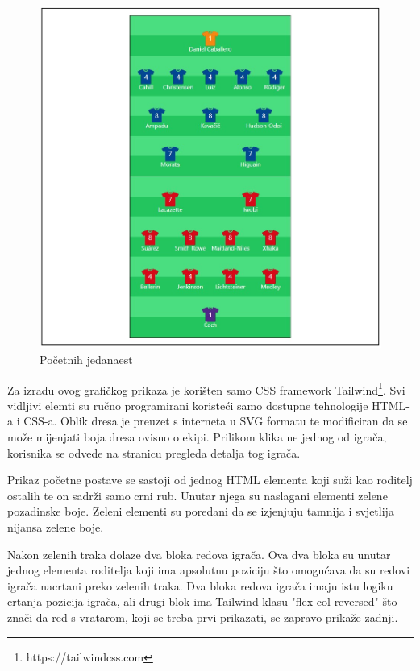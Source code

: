 \documentclass[times, utf8, zavrsni]{fer}
\begin{document}
\begin{figure}[htb]
\centering
\includegraphics[width=15cm]{images/formation.jpg}
\caption{Početnih jedanaest}
\label{fig:formation}
\end{figure}

Za izradu ovog grafičkog prikaza je korišten samo CSS framework Tailwind\footnote{https://tailwindcss.com}.
Svi vidljivi elemti su ručno programirani koristeći samo dostupne tehnologije HTML-a i CSS-a. Oblik dresa je preuzet s interneta u SVG formatu te modificiran da se može mijenjati boja dresa ovisno o ekipi.
Prilikom klika ne jednog od igrača, korisnika se odvede na stranicu pregleda detalja tog igrača.

Prikaz početne postave se sastoji od jednog HTML elementa koji suži kao roditelj ostalih te on sadrži samo crni rub.
Unutar njega su naslagani elementi zelene pozadinske boje. Zeleni elementi su poredani da se izjenjuju tamnija i svjetlija nijansa zelene boje.

Nakon zelenih traka dolaze dva bloka redova igrača. Ova dva bloka su unutar jednog elementa roditelja koji ima apsolutnu poziciju što omogućava da su redovi igrača nacrtani preko zelenih traka.
Dva bloka redova igrača imaju istu logiku crtanja pozicija igrača, ali drugi blok ima Tailwind klasu "flex-col-reversed" što znači da red s vratarom, koji se treba prvi prikazati, se zapravo prikaže zadnji.
\end{document}
